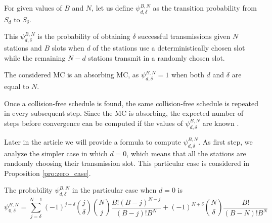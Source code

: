 \documentclass[journal]{IEEEtran}
\begin{document}
\begin{definition}
For given values of $B$ and $N$, let us define $\psi_{d,\delta}^{B,N}$ as the transition probability from $S_d$ to $S_\delta$. 
\end{definition}

This $\psi_{d,\delta}^{B,N}$ is the probability of obtaining $\delta$ successful transmissions given $N$ stations and $B$ slots when $d$ of the stations use a deterministically chosen slot while the remaining $N-d$ stations transmit in a randomly chosen slot.

\begin{remark}
The considered MC is an absorbing MC, as $\psi_{d,\delta}^{B,N}=1$ when both $d$ and $\delta$ are equal to $N$.
\end{remark}

Once a collision-free schedule is found, the same collision-free schedule is repeated in every subsequent step.
Since the MC is absorbing, the expected number of steps before convergence can be computed if the values of $\psi_{d,\delta}^{B,N}$ are known \cite{grinstead1997ip}.

Later in the article we will provide a formula to compute $\psi_{d,\delta}^{B,N}$.
As first step, we analyze the simpler case in which $d=0$, which means that all the stations are randomly choosing their transmission slot. 
This particular case is considered in Proposition \ref{pro:zero_case}.

\begin{proposition}
\label{pro:zero_case}
The probability $\psi^{B,N}_{d,\delta}$ in the particular case when $d=0$ is 
\begin{equation}
\psi^{B,N}_{0,\delta} = \sum_{j=\delta}^{N-1} (-1)^{j+\delta}\binom{j}{\delta} \binom{N}{j}\frac{B! (B-j)^{N-j}}{(B-j)! B^N} + (-1)^{N+\delta}\binom{N}{\delta}\frac{B!}{(B-N)!B^N}
\label{eq:psi_zero}
\end{equation}
\end{proposition}
\end{document}
